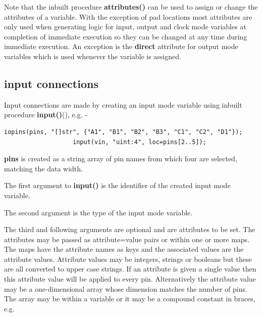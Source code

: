             Note that the inbuilt procedure {\bf attributes()} can be used to assign
            or change the attributes of a variable. With the exception of pad
            locations most attributes are only used when generating logic for input,
            output and clock mode variables at completion of immediate execution so
            they can be changed at any time during immediate execution. An exception
            is the {\bf direct} attribute for output mode variables which is used
            whenever the variable is assigned.


        \subsection{input connections}

            Input connections are made by creating an input mode variable
            using inbuilt procedure {\bf input()}(),
            e.g. -
            \begin{lstlisting}[gobble=12, language=threepl]
                   iopins(pins, "[]str", {"A1", "B1", "B2", "B3", "C1", "C2", "D1"});
                   input(vin, "uint:4", loc=pins[2..5]);
            \end{lstlisting}
            {\bf pins} is created as a string array of pin names from which four
            are selected, matching the data width.
            
            The first argument to {\bf input()} is the identifier of the created
            input mode variable.
            
            The second argument is the type of the input mode variable.
            
            The third and following arguments are optional and are attributes to be
            set. The attributes may be passed as attribute=value pairs or within one
            or more maps. The maps have the attribute names as keys and the
            associated values are the attribute values. Attribute values may be
            integers, strings or booleans but these are all converted to upper case
            strings. If an attribute is given a single value then this attribute
            value will be applied to every pin. Alternatively the attribute value
            may be a one-dimensional array whose dimension matches the number of pins.
            The array may be within a variable or it may be a compound constant in
            braces, e.g. \\
            
